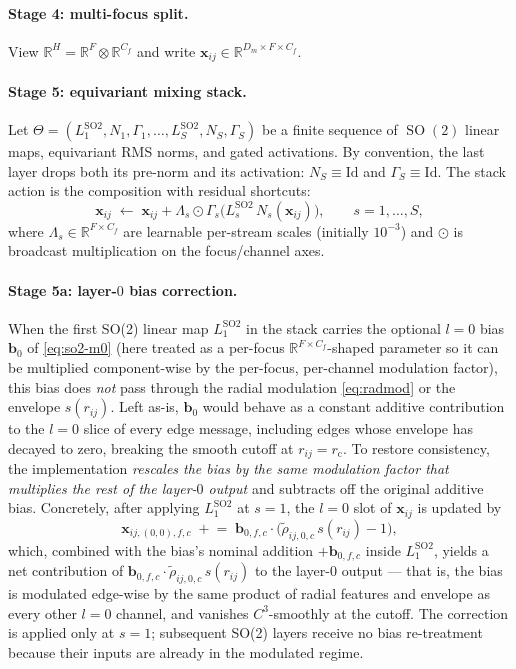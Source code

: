 \documentclass[11pt,a4paper]{article}
\DeclareMathOperator{\SO}{SO}
\newcommand{\R}{\mathbb{R}}
\newcommand{\bx}{\bm{x}}
\newcommand{\rcut}{r_{\mathrm{c}}}
\theoremstyle{plain}
\theoremstyle{definition}
\theoremstyle{remark}
\begin{document}
    \paragraph{Stage 4: multi-focus split.}
    View $\R^{H}=\R^{F}\otimes\R^{C_f}$ and write $\bx_{ij}\in\R^{D_m\times F\times
    C_f}$.

    \paragraph{Stage 5: equivariant mixing stack.}
    Let
$\Theta=(L^{\mathrm{SO2}}_1,N_1,\Gamma_1,\dots,L^{\mathrm{SO2}}_S,N_S,\Gamma_S)$
    be a finite sequence of $\SO(2)$ linear maps, equivariant RMS norms, and gated
    activations. By convention, the last layer drops both its pre-norm and its
    activation: $N_S\equiv\mathrm{Id}$ and $\Gamma_S\equiv\mathrm{Id}$. The stack
    action is the composition with residual shortcuts:
    \begin{equation}\label{eq:so2-stack}
        \bx_{ij}\;\leftarrow\;\bx_{ij}+\Lambda_{s}\odot\Gamma_s\!\bigl(L^{\mathrm{SO2}}_s\,N_s(\bx_{ij})\bigr),\qquad s=1,\dots,S,
    \end{equation}
    where $\Lambda_s\in\R^{F\times C_f}$ are learnable per-stream scales (initially $10^{-3}$) and $\odot$ is broadcast multiplication on the focus/channel axes.

    \paragraph{Stage 5a: layer-$0$ bias correction.}
    When the first SO(2) linear map $L^{\mathrm{SO2}}_1$ in the stack carries the
    optional $l=0$ bias $\bm{b}_0$ of \eqref{eq:so2-m0} (here treated as a
    per-focus $\R^{F\times C_f}$-shaped parameter so it can be multiplied
    component-wise by the per-focus, per-channel modulation factor), this bias does
    \emph{not} pass through the radial modulation \eqref{eq:radmod} or the envelope
$s(r_{ij})$. Left as-is, $\bm{b}_0$ would behave as a constant additive
    contribution to the $l=0$ slice of every edge message, including edges whose
    envelope has decayed to zero, breaking the smooth cutoff at $r_{ij}=\rcut$. To
    restore consistency, the implementation \emph{rescales the bias by the same
    modulation factor that multiplies the rest of the layer-$0$ output} and
    subtracts off the original additive bias. Concretely, after applying
$L^{\mathrm{SO2}}_1$ at $s=1$, the $l=0$ slot of $\bx_{ij}$ is updated by
    \begin{equation}\label{eq:bias-corr}
        \bx_{ij,(0,0),f,c}\;\mathrel{+}=\;\bm{b}_{0,f,c}\cdot\bigl(\widetilde\rho_{ij,0,c}\,s(r_{ij})-1\bigr),
    \end{equation}
    which, combined with the bias's nominal addition $+\bm{b}_{0,f,c}$ inside $L^{\mathrm{SO2}}_1$, yields a net contribution of $\bm{b}_{0,f,c}\cdot\widetilde\rho_{ij,0,c}\,s(r_{ij})$ to the layer-$0$ output --- that is, the bias is modulated edge-wise by the same product of radial features and envelope as every other $l=0$ channel, and vanishes $C^3$-smoothly at the cutoff.
    The correction is applied only at $s=1$; subsequent SO(2) layers receive no bias re-treatment because their inputs are already in the modulated regime.
\end{document}
